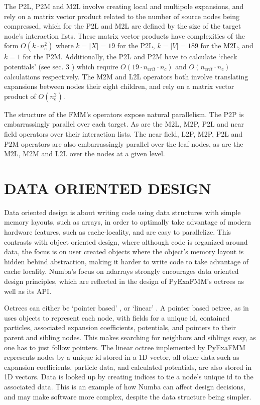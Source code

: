 \documentclass{IEEEcsmag}
\begin{document}
The P2L, P2M and M2L involve creating local and multipole expansions, and rely on a matrix vector product related to the number of source nodes being compressed, which for the P2L and M2L are defined by the size of the target node's interaction lists. These matrix vector products have complexities of the form $O(k \cdot n_e^2)$ where $k = |X| = 19$ for the P2L, $k = |V| = 189$ for the M2L, and $k = 1$ for the P2M. Additionally, the P2L and P2M have to calculate `check potentials' (see sec. 3 \cite{Ying2004}) which require $O(19 \cdot n_{crit} \cdot n_c)$ and $O(n_{crit} \cdot n_c)$ calculations respectively. The M2M and L2L operators both involve translating expansions between nodes their eight children, and rely on a matrix vector product of $O(n_e^2)$.

The structure of the FMM's operators expose natural parallelism. The P2P is embarrassingly parallel over each target. As are the M2L, M2P, P2L and near field operators over their interaction lists. The near field, L2P, M2P, P2L and P2M operators are also embarrassingly parallel over the leaf nodes, as are the M2L, M2M and L2L over the nodes at a given level.

\section{DATA ORIENTED DESIGN}

Data oriented design is about writing code using data structures with simple memory layouts, such as arrays, in order to optimally take advantage of modern hardware features, such as cache-locality, and are easy to parallelize. This contrasts with object oriented design, where although code is organized around data, the focus is on user created objects where the object's memory layout is hidden behind abstraction, making it harder to write code to take advantage of cache locality. Numba's focus on ndarrays strongly encourages data oriented design principles, which are reflected in the design of PyExaFMM's octrees as well as its API.

Octrees can either be `pointer based' \cite{Wang2021}, or `linear' \cite{Sundar2007}. A pointer based octree, as in uses objects to represent each node, with fields for a unique id, contained particles, associated expansion coefficients, potentials, and pointers to their parent and sibling nodes. This makes searching for neighbors and siblings easy, as one has to just follow pointers. The linear octree implemented by PyExaFMM represents nodes by a unique id stored in a 1D vector, all other data such as expansion coefficients, particle data, and calculated potentials, are also stored in 1D vectors. Data is looked up by creating indices to tie a node's unique id to the associated data. This is an example of how Numba can affect design decisions, and may make software more complex, despite the data structure being simpler.
\end{document}
